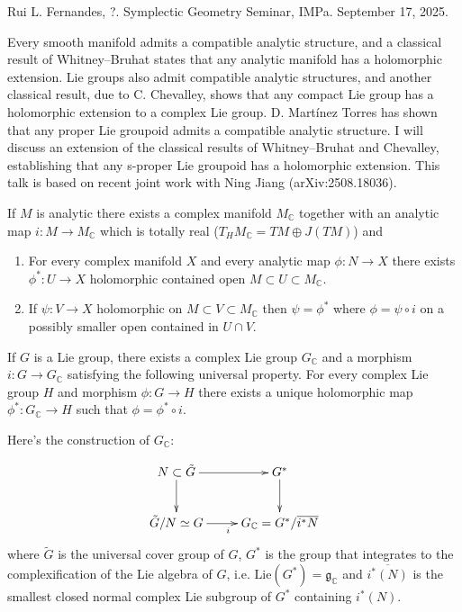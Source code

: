 {\noindent
Rui L. Fernandes, ?.
Symplectic Geometry Seminar, IMPa. 
September 17, 2025.

 Every smooth manifold admits a compatible analytic
structure, and a classical result of Whitney–Bruhat states that any analytic
manifold has a holomorphic extension. Lie groups also admit compatible analytic
structures, and another classical result, due to C. Chevalley, shows that any
compact Lie group has a holomorphic extension to a complex Lie group. D.
Martínez Torres has shown that any proper Lie groupoid admits a compatible
analytic structure. I will discuss an extension of the classical results of
Whitney–Bruhat and Chevalley, establishing that any s-proper Lie groupoid has a
holomorphic extension. This talk is based on recent joint work with Ning Jiang
(arXiv:2508.18036).

\medskip\noindent

\begin{theorem}
\label{theorem-Whitney-Beuhat}
If $M$ is analytic there exists a complex manifold  $M_\mathbb{C}$
together with an analytic map $i: M \to M_\mathbb{C}$ 
which is totally real ($T_HM_{\mathbb{C}}=TM \oplus J(TM)$)
and
\begin{enumerate}
\item For every complex manifold $X$ and every
analytic map $\phi:N \to X$ there exists $\phi^*:U \to X$ 
holomorphic contained open $M \subset U \subset M_\mathbb{C}$.
\item If $\psi:V \to X$ holomorphic on $M \subset V \subset M_\mathbb{C}$ then
$\psi=\phi^*$ where $\phi=\psi \circ i$ on a possibly
smaller open contained in $U \cap V$.
\end{enumerate}
\end{theorem}

\begin{theorem}[Chevalley]
\label{theorem-Chevalley}
If $G$ is a Lie group, there exists a complex
Lie group $G_{\mathbb{C}}$ and a morphism $i:G \to G_\mathbb{C}$ 
satisfying the following universal property.
For every complex Lie group $H$ and morphism
$\phi:G \to H$ there exists a unique
holomorphic map $\phi^*:G_\mathbb{C} \to H$ such that
$\phi=\phi^* \circ i$.
\end{theorem}

Here's the construction of $G_\mathbb{C}$:

$$
\xymatrix{
N\subset \tilde{G}\ar[r]\ar[d]&G^*\ar[d]\\
\tilde{G}/N \simeq G\ar[r]_{i}&G_\mathbb{C}=G^* /\overline{i^*N}
}
$$
where $\tilde{G}$ is the universal cover group of $G$,
 $G^*$ is the group that integrates to 
the complexification of the Lie algebra of $G$,
i.e. $\text{Lie}(G^*)=\mathfrak{g}_\mathbb{C}$
and $\overline{i^*(N)}$ is the smallest closed
normal complex Lie subgroup of $G^*$
containing $i^*(N)$.

}
